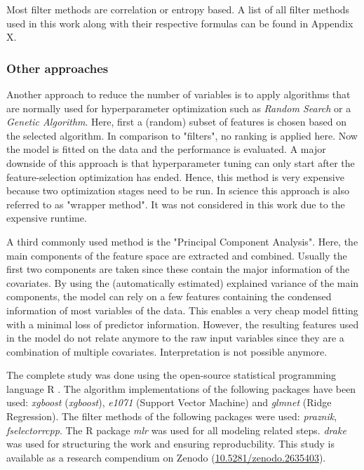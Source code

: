 \documentclass[review]{elsarticle}
\begin{document}
Most filter methods are correlation or entropy based.
A list of all filter methods used in this work along with their respective formulas can be found in Appendix X.

\subsubsection{Other approaches}

Another approach to reduce the number of variables is to apply algorithms that are normally used for hyperparameter optimization such as \textit{Random Search} or a \textit{Genetic Algorithm}.
Here, first a (random) subset of features is chosen based on the selected algorithm.
In comparison to "filters", no ranking is applied here.
Now the model is fitted on the data and the performance is evaluated.
A major downside of this approach is that hyperparameter tuning can only start after the feature-selection optimization has ended.
Hence, this method is very expensive because two optimization stages need to be run.
In science this approach is also referred to as "wrapper method".
It was not considered in this work due to the expensive runtime.

A third commonly used method is the "Principal Component Analysis".
Here, the main components of the feature space are extracted and combined.
Usually the first two components are taken since these contain the major information of the covariates.
By using the (automatically estimated) explained variance of the main components, the model can rely on a few features containing the condensed information of most variables of the data.
This enables a very cheap model fitting with a minimal loss of predictor information.
However, the resulting features used in the model do not relate anymore to the raw input variables since they are a combination of multiple covariates.
Interpretation is not possible anymore.

\noindent The complete study was done using the open-source statistical programming language R \citep{rcoreteam2018}.
The algorithm implementations of the following packages have been used: \textit{xgboost} \citep{chen2016} (\textit{xgboost}), \textit{e1071} \citep{e1071} (Support Vector Machine) and \textit{glmnet} \citep{glmnet} (Ridge Regression).
The filter methods of the following packages were used: \textit{praznik}, \textit{fselectorrcpp}.
The R package \textit{mlr} \citep{mlr} was used for all modeling related steps.
\textit{drake} was used for structuring the work and ensuring reproducbility.
This study is available as a research compendium on Zenodo (\url{10.5281/zenodo.2635403}).
\end{document}
